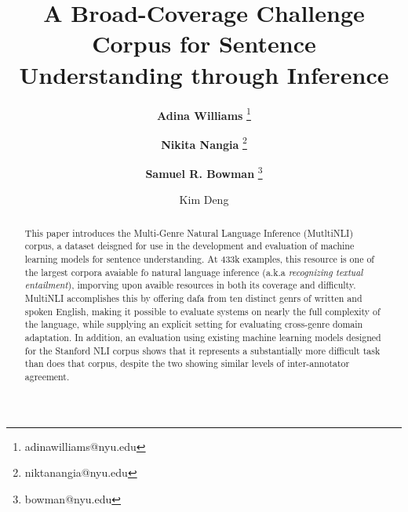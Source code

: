 \documentclass[12pt,UTF8,a4paper,twocolumn]{article}
\begin{document}
  \title{\textbf{A Broad-Coverage Challenge Corpus for Sentence Understanding through Inference}}



  \author[1]{\textbf{Adina Williams} \thanks{ adinawilliams@nyu.edu}}
  \author[2]{\textbf{Nikita Nangia} \thanks{niktanangia@nyu.edu}}
  \author[1,2,3]{\textbf{Samuel R. Bowman} \thanks{bowman@nyu.edu}}


  \author{Kim Deng \textsuperscript{}}





  \date{} %
  \maketitle %


  \begin{abstract}
  This paper introduces the Multi-Genre Natural Language Inference (MutltiNLI) corpus, a dataset deisgned for use in the development and evaluation of machine learning models for sentence understanding. At 433k examples, this resource is one of the largest corpora avaiable fo natural language inference (a.k.a \emph{recognizing textual entailment}), imporving upon avaible resources in both its coverage and difficulty. MultiNLI accomplishes this by offering dafa from ten distinct genrs of written and spoken English, making it possible to evaluate systems on nearly the full complexity of the language, while supplying an explicit setting for evaluating cross-genre domain adaptation. In addition, an evaluation using existing machine learning models designed for the Stanford NLI corpus shows that it represents a substantially more difficult task than does that corpus, despite the two showing similar levels of inter-annotator agreement.
  \end{abstract}
\end{document}
